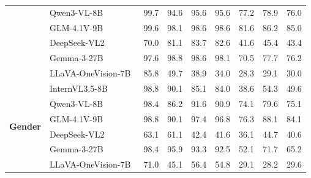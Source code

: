 \documentclass[lettersize,journal]{IEEEtran}
\begin{document}
\begin{table}[t]
\begin{tabular}{l|l|ccccccc}
 & Qwen3-VL-8B~\cite{qwen3vl}              & \cellcolor{green!30}99.7 & \cellcolor{green!30}94.6 & \cellcolor{green!30}95.6 & \cellcolor{green!30}95.6 & 77.2 & 78.9 & 76.0 \\
 & GLM-4.1V-9B~\cite{glm41v}               & \cellcolor{green!30}99.6 & \cellcolor{green!30}98.1 & \cellcolor{green!30}98.6 & \cellcolor{green!30}98.6 & 81.6 & \cellcolor{green!15}86.2 & \cellcolor{green!15}85.0 \\
 & DeepSeek-VL2~\cite{deepseekvl2}         & 70.0 & 81.1 & 83.7 & 82.6 & \cellcolor{red!30}41.6 & \cellcolor{red!30}45.4 & \cellcolor{red!30}43.4 \\
 & Gemma-3-27B~\cite{gemma3}               & \cellcolor{green!30}97.6 & \cellcolor{green!30}98.8 & \cellcolor{green!30}98.6 & \cellcolor{green!30}98.1 & 70.5 & 77.7 & 76.2 \\
 & LLaVA-OneVision-7B~\cite{llava_onevision} & \cellcolor{green!15}85.8 & \cellcolor{red!30}49.7 & \cellcolor{red!30}38.9 & \cellcolor{red!30}34.0 & \cellcolor{red!30}28.3 & \cellcolor{red!30}29.1 & \cellcolor{red!30}30.0 \\
\midrule
\multirow{6}{*}{\textbf{Gender}}
 & InternVL3.5-8B~\cite{internvl35}        & \cellcolor{green!30}98.8 & \cellcolor{green!30}90.1 & \cellcolor{green!15}85.1 & 84.0 & \cellcolor{red!30}38.6 & \cellcolor{red!15}54.3 & \cellcolor{red!30}49.6 \\
 & Qwen3-VL-8B~\cite{qwen3vl}              & \cellcolor{green!30}98.4 & \cellcolor{green!15}86.2 & \cellcolor{green!30}91.6 & \cellcolor{green!30}90.9 & 74.1 & 79.6 & 75.1 \\
 & GLM-4.1V-9B~\cite{glm41v}               & \cellcolor{green!30}98.8 & \cellcolor{green!30}90.1 & \cellcolor{green!30}97.4 & \cellcolor{green!30}96.8 & 76.3 & \cellcolor{green!15}88.1 & 84.1 \\
 & DeepSeek-VL2~\cite{deepseekvl2}         & \cellcolor{red!15}63.1 & \cellcolor{red!15}61.1 & \cellcolor{red!30}42.4 & \cellcolor{red!30}41.6 & \cellcolor{red!30}36.1 & \cellcolor{red!30}44.7 & \cellcolor{red!30}40.6 \\
 & Gemma-3-27B~\cite{gemma3}               & \cellcolor{green!30}98.4 & \cellcolor{green!30}95.9 & \cellcolor{green!30}93.3 & \cellcolor{green!30}92.5 & \cellcolor{red!15}52.1 & 71.7 & \cellcolor{red!15}65.2 \\
 & LLaVA-OneVision-7B~\cite{llava_onevision} & 71.0 & \cellcolor{red!30}45.1 & \cellcolor{red!15}56.4 & \cellcolor{red!15}54.8 & \cellcolor{red!30}29.1 & \cellcolor{red!30}28.2 & \cellcolor{red!30}29.6 \\

\end{tabular}
\end{table}
\end{document}
